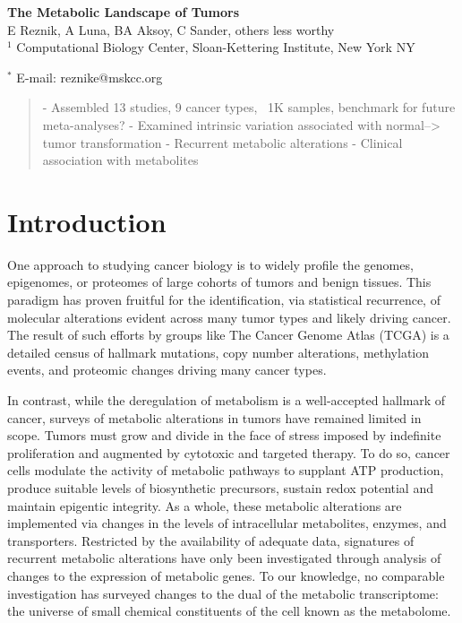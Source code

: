\documentclass[10pt]{article}
\date{}
\begin{document}
\begin{flushleft}
{\Large
\textbf{The Metabolic Landscape of Tumors}
}
\\
E Reznik, A Luna, BA Aksoy, C Sander, others less worthy
\\
$^1$ Computational Biology Center, Sloan-Kettering Institute, New York NY

$^\ast$ E-mail: reznike@mskcc.org
\end{flushleft}

\begin{abstract}
- Assembled 13 studies, 9 cancer types, ~1K samples, benchmark for future meta-analyses?
- Examined intrinsic variation associated with normal--> tumor transformation
- Recurrent metabolic alterations
- Clinical association with metabolites
\end{abstract}

\section{Introduction}
One approach to studying cancer biology is to widely profile the genomes, epigenomes, or proteomes of large cohorts of tumors and benign tissues. This paradigm has proven fruitful for the identification, via statistical recurrence, of molecular alterations evident across many tumor types and likely driving cancer. The result of such efforts by groups like The Cancer Genome Atlas (TCGA) is a detailed census of hallmark mutations, copy number alterations, methylation events, and proteomic changes driving many cancer types.

In contrast, while the deregulation of metabolism is a well-accepted hallmark of cancer, surveys of metabolic alterations in tumors have remained limited in scope. Tumors must grow and divide in the face of stress imposed by indefinite proliferation and augmented by cytotoxic and targeted therapy. To do so, cancer cells modulate the activity of metabolic pathways to supplant ATP production, produce suitable levels of biosynthetic precursors, sustain redox potential and maintain epigentic integrity. As a whole, these metabolic alterations are implemented via changes in the levels of intracellular metabolites, enzymes, and transporters. Restricted by the availability of adequate data, signatures of recurrent metabolic alterations have only been investigated through analysis of changes to the expression of metabolic genes. To our knowledge, no comparable investigation has surveyed changes to the dual of the metabolic transcriptome: the universe of small chemical constituents of the cell known as the metabolome.
\end{document}

